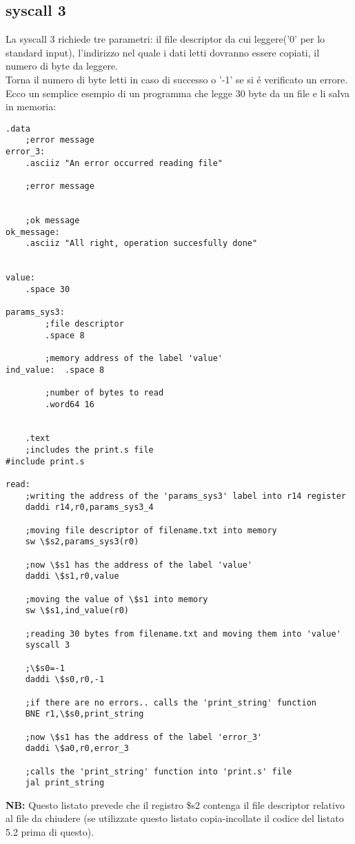 \documentclass[12pt]{report}
\newcommand{\OF}{\textbf{NB:} Questo listato prevede che il registro \$s2 contenga il file descriptor
relativo al file da chiudere (se utilizzate questo listato copia-incollate il codice del listato 5.2 prima di questo).}
\begin{document}
\subsection{syscall 3}
La syscall 3 richiede tre parametri: il file descriptor da cui leggere('0' per lo standard input), 
l’indirizzo nel quale i dati letti dovranno essere copiati, il numero di byte da leggere.\\
Torna il numero di byte letti in caso di successo o '-1' se si \'{e} verificato un errore.\\ 
Ecco un semplice esempio di un programma che legge 30 byte da un file e li salva in memoria:
\begin{lstlisting}[caption={syscall3}, label={code:syscall3}, style={mips}]
      		.data
	;error message
error_3:	
	.asciiz "An error occurred reading file"	

	;error message


	;ok message
ok_message:	
	.asciiz "All right, operation succesfully done"	


value:		
	.space 30					

params_sys3:	
		;file descriptor		
		.space 8	
		
		;memory address of the label 'value'				
ind_value:	.space 8

		;number of bytes to read					
		.word64 16					


	.text
	;includes the print.s file
#include print.s	

read:
	;writing the address of the 'params_sys3' label into r14 register
	daddi r14,r0,params_sys3_4	

	;moving file descriptor of filename.txt into memory
	sw \$s2,params_sys3(r0)

	;now \$s1 has the address of the label 'value'
	daddi \$s1,r0,value

	;moving the value of \$s1 into memory			
	sw \$s1,ind_value(r0)	

	;reading 30 bytes from filename.txt and moving them into 'value'			
	syscall 3			
	
	;\$s0=-1
	daddi \$s0,r0,-1			

	;if there are no errors.. calls the 'print_string' function	
	BNE r1,\$s0,print_string

	;now \$s1 has the address of the label 'error_3'		
	daddi \$a0,r0,error_3

	;calls the 'print_string' function into 'print.s' file
	jal print_string
\end{lstlisting}
\OF{}
\end{document}

